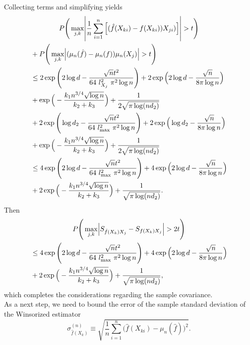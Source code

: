 Collecting terms and simplifying yields
\begin{multline*}
    P\Bigg(\max_{j,k}\abs{\frac{1}{n}\sum_{i=1}^n \Big[(\hat{f}(X_{ki}) - f(X_{ki}))X_{ji})\Big]} > t \Bigg) \\
    \begin{aligned}
        &+ P\Bigg(\max_{j,k}\abs{(\mu_n(\hat{f}) - \mu_n(f))\mu_n(X_j)} > t \Bigg) \\
        &\leq 2\exp\Bigg(2\log d - \frac{\sqrt{n}t^2}{64 \ l_{X_j}^2 \ \pi^2 \log n}\Bigg) + 2\exp\Big(2\log d - \frac{\sqrt{n}}{8\pi\log n}\Big) \\
        &+ \exp\Big(- \frac{k_1 n^{3/4} \sqrt{\log n}}{k_2+ k_3} \Big) + \frac{1}{2\sqrt{\pi \log(nd_2)}} \\
        &+ 2\exp\Bigg(\log d_2 - \frac{\sqrt{n}t^2}{64 \ l_{\max}^2 \ \pi^2 \log n}\Bigg) + 2\exp\Big(\log d_2 - \frac{\sqrt{n}}{8\pi\log n}\Big) \\
        &+ \exp\Big(- \frac{k_1 n^{3/4} \sqrt{\log n}}{k_2+ k_3} \Big) + \frac{1}{2\sqrt{\pi \log(nd_2)}} \\
        &\leq 4\exp\Bigg(2\log d - \frac{\sqrt{n}t^2}{64 \ l_{\max}^2 \ \pi^2 \log n}\Bigg) + 4\exp\Big(2\log d - \frac{\sqrt{n}}{8\pi\log n}\Big) \\
        &+ 2\exp\Big(- \frac{k_1 n^{3/4} \sqrt{\log n}}{k_2+ k_3} \Big) + \frac{1}{\sqrt{\pi \log(nd_2)}}.
    \end{aligned}
\end{multline*}
Then
\begin{multline}
    P\Bigg(\max_{j,k} \abs{S_{\hat{f}(X_k)X_j} - S_{f(X_k)X_j}} > 2t \Bigg) \\
    \begin{aligned}
    &\leq 4\exp\Bigg(2\log d - \frac{\sqrt{n}t^2}{64 \ l_{\max}^2 \ \pi^2 \log n}\Bigg) + 4\exp\Big(2\log d - \frac{\sqrt{n}}{8\pi\log n}\Big) \\
    &+ 2\exp\Big(- \frac{k_1 n^{3/4} \sqrt{\log n}}{k_2+ k_3} \Big) + \frac{1}{\sqrt{\pi \log(nd_2)}},
    \end{aligned}
\end{multline}
which completes the considerations regarding the sample covariance. \\

\noindent As a next step, we need to bound the error of the sample standard deviation of the Winsorized estimator
\begin{equation*}
    \sigma^{(n)}_{\hat{f}(X_k)} \equiv \sqrt{\frac{1}{n}\sum_{i=1}^n \Big(\hat{f}(X_{ki}) - \mu_n(\hat{f})\Big)^2}.
\end{equation*}

